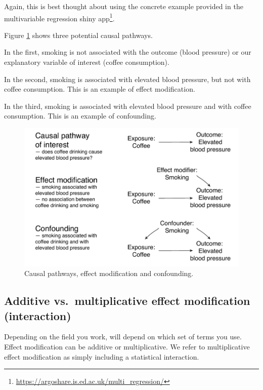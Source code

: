 \documentclass[12pt,]{krantz}
\renewcommand{\href}[2]{#2\footnote{\url{#1}}}
\theoremstyle{definition}
\theoremstyle{definition}
\theoremstyle{definition}
\theoremstyle{remark}
\begin{document}
Again, this is best thought about using the concrete example provided in
the \href{https://argoshare.is.ed.ac.uk/multi_regression/}{multivariable
regression shiny app}.

Figure \ref{fig:chap07-fig-dags} shows three potential causal pathways.

In the first, smoking is not associated with the outcome (blood
pressure) or our explanatory variable of interest (coffee consumption).

In the second, smoking is associated with elevated blood pressure, but
not with coffee consumption. This is an example of effect modification.

In the third, smoking is associated with elevated blood pressure and
with coffee consumption. This is an example of confounding.

\begin{figure}
\centering
\includegraphics{images/chapter07/5_dags.pdf}
\caption{\label{fig:chap07-fig-dags}Causal pathways, effect modification and
confounding.}
\end{figure}

\hypertarget{additive-vs.multiplicative-effect-modification-interaction}{%
\subsection{Additive vs.~multiplicative effect modification
(interaction)}\label{additive-vs.multiplicative-effect-modification-interaction}}

Depending on the field you work, will depend on which set of terms you
use. Effect modification can be additive or multiplicative. We refer to
multiplicative effect modification as simply including a statistical
interaction.
\end{document}
